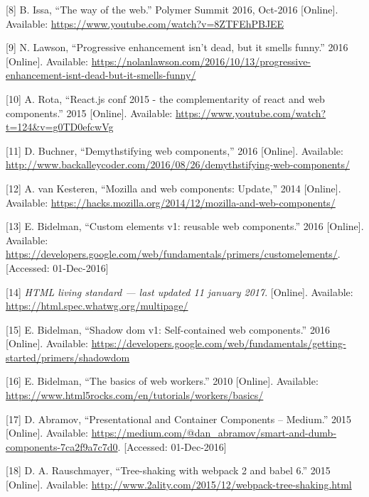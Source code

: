\documentclass[]{article}
\begin{document}
\hypertarget{ref-Issa2016}{}
{[}8{]} B. Issa, ``The way of the web.'' Polymer Summit 2016, Oct-2016
{[}Online{]}. Available:
\url{https://www.youtube.com/watch?v=8ZTFEhPBJEE}

\hypertarget{ref-Lawson2016}{}
{[}9{]} N. Lawson, ``Progressive enhancement isn't dead, but it smells
funny.'' 2016 {[}Online{]}. Available:
\url{https://nolanlawson.com/2016/10/13/progressive-enhancement-isnt-dead-but-it-smells-funny/}

\hypertarget{ref-Rota2015}{}
{[}10{]} A. Rota, ``React.js conf 2015 - the complementarity of react
and web components.'' 2015 {[}Online{]}. Available:
\url{https://www.youtube.com/watch?t=124\&v=g0TD0efcwVg}

\hypertarget{ref-Buchner2016}{}
{[}11{]} D. Buchner, ``Demythstifying web components,'' 2016
{[}Online{]}. Available:
\url{http://www.backalleycoder.com/2016/08/26/demythstifying-web-components/}

\hypertarget{ref-vanKesteren2014}{}
{[}12{]} A. van Kesteren, ``Mozilla and web components: Update,'' 2014
{[}Online{]}. Available:
\url{https://hacks.mozilla.org/2014/12/mozilla-and-web-components/}

\hypertarget{ref-Bidelman2016}{}
{[}13{]} E. Bidelman, ``Custom elements v1: reusable web components.''
2016 {[}Online{]}. Available:
\url{https://developers.google.com/web/fundamentals/primers/customelements/}.
{[}Accessed: 01-Dec-2016{]}

\hypertarget{ref-HTML}{}
{[}14{]} \emph{HTML living standard --- last updated 11 january 2017}.
{[}Online{]}. Available: \url{https://html.spec.whatwg.org/multipage/}

\hypertarget{ref-Bidelman2016shadow}{}
{[}15{]} E. Bidelman, ``Shadow dom v1: Self-contained web components.''
2016 {[}Online{]}. Available:
\url{https://developers.google.com/web/fundamentals/getting-started/primers/shadowdom}

\hypertarget{ref-Bidelman2010}{}
{[}16{]} E. Bidelman, ``The basics of web workers.'' 2010 {[}Online{]}.
Available: \url{https://www.html5rocks.com/en/tutorials/workers/basics/}

\hypertarget{ref-Abramov2015}{}
{[}17{]} D. Abramov, ``Presentational and Container Components --
Medium.'' 2015 {[}Online{]}. Available:
\url{https://medium.com/@dan_abramov/smart-and-dumb-components-7ca2f9a7c7d0}.
{[}Accessed: 01-Dec-2016{]}

\hypertarget{ref-Rauschmayer2015}{}
{[}18{]} D. A. Rauschmayer, ``Tree-shaking with webpack 2 and babel 6.''
2015 {[}Online{]}. Available:
\url{http://www.2ality.com/2015/12/webpack-tree-shaking.html}
\end{document}
